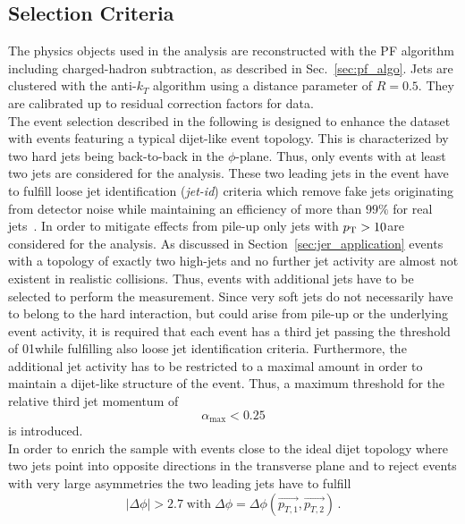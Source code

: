 \subsection{Selection Criteria}
\label{subsec:jer_sel_cuts}
The physics objects used in the analysis are reconstructed with the PF algorithm including charged-hadron subtraction, as described in Sec.~\ref{sec:pf_algo}. Jets are clustered with the anti-$k_T$ algorithm using a distance parameter of $R=0.5$. They are calibrated up to residual correction factors for data. \\
The event selection described in the following is designed to enhance the dataset with events featuring a typical dijet-like event topology. This is characterized by two hard jets being back-to-back in the $\phi$-plane. Thus, only events with at least two jets are considered for the analysis. These two leading jets in the event have to fulfill loose jet identification (\textit{jet-id}) criteria which remove fake jets originating from detector noise while maintaining an efficiency of more than $99\%$ for real jets~\cite{CMS-PAS-JME-09-008, CMS-PAS-JME-10-003}. In order to mitigate effects from pile-up only jets with $p_{\text{T}} > 10$\gev are considered for the analysis. As discussed in Section~\ref{sec:jer_application} events with a topology of exactly two high-\pt jets and no further jet activity are almost not existent in realistic collisions. Thus, events with additional jets have to be selected to perform the measurement. Since very soft jets do not necessarily have to belong to the hard interaction, but could arise from pile-up or the underlying event activity, it is required that each event has a third jet passing the \pt threshold of 01\gev while fulfilling also loose jet identification criteria. Furthermore, the additional jet activity has to be restricted to a maximal amount in order to maintain a dijet-like structure of the event. Thus, a maximum threshold for the relative third jet momentum of 
\begin{equation*}
\alpha_\mathrm{max} < 0.25 
\end{equation*}
is introduced.\\
In order to enrich the sample with events close to the ideal dijet topology where two jets point into opposite directions in the transverse plane and to reject events with very large asymmetries the two leading jets have to fulfill 
\begin{equation}
|\Delta \phi| > 2.7 \; \mathrm{with} \; \Delta \phi = \Delta \phi(\vec{p_{T,1}}, \vec{p_{T,2}}) \, .
\end{equation}  
